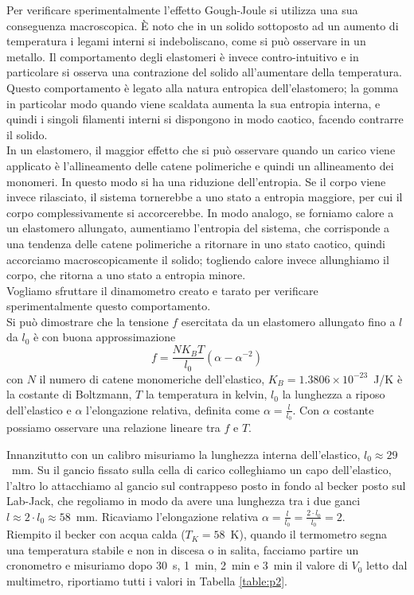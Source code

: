 \documentclass[italian, a4paper, 10pt, twocolumn]{../../style/lab_unige}
\newcommand{\reftab}[1]{Tabella {\ref{#1}}}%
\begin{document}
    Per verificare sperimentalmente l'effetto Gough-Joule si utilizza una sua conseguenza macroscopica. È noto che in un solido sottoposto ad un aumento di temperatura i legami interni si indeboliscano, come si può osservare in un metallo. Il comportamento degli elastomeri è invece contro-intuitivo e in particolare si osserva una contrazione del solido all'aumentare della temperatura. Questo comportamento è legato alla natura entropica dell'elastomero; la gomma in particolar modo quando viene scaldata aumenta la sua entropia interna, e quindi i singoli filamenti interni si dispongono in modo caotico, facendo contrarre il solido. \\
    In un elastomero, il maggior effetto che si può osservare quando un carico viene applicato è l'allineamento delle catene polimeriche e quindi un allineamento dei monomeri. In questo modo si ha una riduzione dell'entropia. Se il corpo viene invece rilasciato, il sistema tornerebbe a uno stato a entropia maggiore, per cui il corpo complessivamente si accorcerebbe. In modo analogo, se forniamo calore a un elastomero allungato, aumentiamo l'entropia del sistema, che corrisponde a una tendenza delle catene polimeriche a ritornare in uno stato caotico, quindi accorciamo macroscopicamente il solido; togliendo calore invece allunghiamo il corpo, che ritorna a uno stato a entropia minore.\\
    Vogliamo sfruttare il dinamometro creato e tarato per verificare sperimentalmente questo comportamento.\\
    Si può dimostrare che la tensione $f$ esercitata da un elastomero allungato fino a $l$ da $l_0$ è con buona approssimazione
    \begin{equation}
        f=\frac{NK_BT}{l_0}\left(\alpha-\alpha^{-2}\right)\label{equation:f_T}
    \end{equation}
    con $N$ il numero di catene monomeriche dell'elastico, $K_B=1.3806\times10^{-23}$~J/K è la costante di Boltzmann, $T$ la temperatura in kelvin, $l_0$ la lunghezza a riposo dell'elastico e $\alpha$ l'elongazione relativa, definita come $\alpha=\frac{l}{l_{0}}$. Con $\alpha$ costante possiamo osservare una relazione lineare tra $f$ e $T$.
    
    
    Innanzitutto con un calibro misuriamo la lunghezza interna dell'elastico, $l_{0}\approx29$~mm. Su il gancio fissato sulla cella di carico colleghiamo un capo dell'elastico, l'altro lo attacchiamo al gancio sul contrappeso posto in fondo al becker posto sul Lab-Jack, che regoliamo in modo da avere una lunghezza tra i due ganci $l\approx2\cdot l_{0}\approx58$~mm. Ricaviamo l'elongazione relativa $\alpha=\frac{l}{l_{0}}=\frac{2\cdot l_0}{l_0}=2$.\\
    Riempito il becker con acqua calda ($T_K=58$~K), quando il termometro segna una temperatura stabile e non in discesa o in salita, facciamo partire un cronometro e misuriamo dopo 30~s, 1~min, 2~min e 3~min il valore di $V_0$ letto dal multimetro, riportiamo tutti i valori in \reftab{table:p2}.
    
\end{document}
